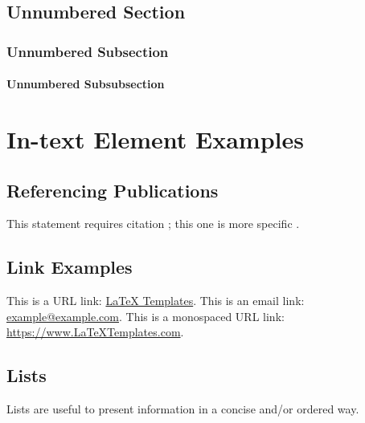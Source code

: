\documentclass[
	11pt, %
	fleqn, %
	a4paper, %
]{LegrandOrangeBook}
\begin{document}

\section*{Unnumbered Section}

\subsection*{Unnumbered Subsection}

\subsubsection*{Unnumbered Subsubsection}






\chapter{In-text Element Examples}

\section{Referencing Publications}
This statement requires citation \cite{Smith:2022jd}; this one is more specific \cite[162]{Smith:2021qr}.








\section{Link Examples}

This is a URL link: \href{https://www.latextemplates.com}{LaTeX Templates}. This is an email link: \href{mailto:example@example.com}{example@example.com}. This is a monospaced URL link: \url{https://www.LaTeXTemplates.com}.


\section{Lists}
Lists are useful to present information in a concise and/or ordered way.
\end{document}
